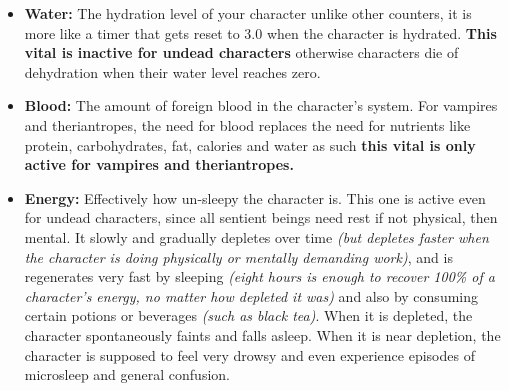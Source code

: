 \begin{itemize}
\item \textbf{Water:} The hydration level of your character \textemdash unlike other counters, it is more like a timer that gets reset to 3.0 when the character is hydrated. \textbf{This vital is inactive for undead characters} \textemdash otherwise characters die of dehydration when their water level reaches zero.
\item \textbf{Blood:} The amount of foreign blood in the character's system. For vampires and theriantropes, the need for blood replaces the need for nutrients like protein, carbohydrates, fat, calories and water \textemdash as such \textbf{this vital is only active for vampires and theriantropes.}
\item \textbf{Energy:} Effectively how un-sleepy the character is. This one is active even for undead characters, since all sentient beings need rest \textemdash if not physical, then mental. It slowly and gradually depletes over time \textit{(but depletes faster when the character is doing physically or mentally demanding work)}, and is regenerates very fast by sleeping \textit{(eight hours is enough to recover 100\% of a character's energy, no matter how depleted it was)} and also by consuming certain potions or beverages  \textit{(such as black tea)}. When it is depleted, the character spontaneously faints and falls asleep. When it is near depletion, the character is supposed to feel very drowsy and even experience episodes of microsleep and general confusion.
\end{itemize}
